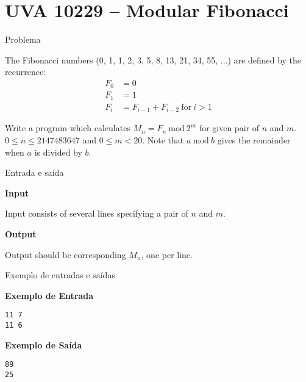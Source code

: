 \section{UVA 10229 -- Modular Fibonacci}

\begin{frame}[fragile]{Problema}

The Fibonacci numbers (0, 1, 1, 2, 3, 5, 8, 13, 21, 34, 55, ...) are defined by the recurrence:
\begin{align*}
F_0 &= 0 \\
F_1 &= 1 \\
F_i &= F_{i-1} + F_{i-2}\ \mbox{for}\ i > 1
\end{align*}

Write a program which calculates $M_n = F_n\ \mbox{mod}\ 2^m$
for given pair of $n$ and $m$. $0 \leq n \leq 2147483647$
and $0 \leq m < 20$. Note that $a\ \mbox{mod}\ b$ gives the remainder when $a$ is divided by $b$.
\end{frame}

\begin{frame}[fragile]{Entrada e saída}

\textbf{Input}

Input consists of several lines specifying a pair of $n$ and $m$.

\vspace{0.5in}

\textbf{Output}

Output should be corresponding $M_n$, one per line.

\end{frame}

\begin{frame}[fragile]{Exemplo de entradas e saídas}

\begin{minipage}[t]{0.5\textwidth}
\textbf{Exemplo de Entrada}
\begin{verbatim}
11 7
11 6
\end{verbatim}
\end{minipage}
\begin{minipage}[t]{0.45\textwidth}
\textbf{Exemplo de Saída}
\begin{verbatim}
89
25
\end{verbatim}
\end{minipage}
\end{frame}

